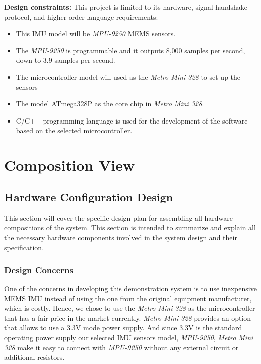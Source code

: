 		\textbf{Design constraints:} This project is limited to its hardware, signal handshake protocol, and higher order language requirements:\\
		\begin{itemize}
			\item This IMU model will be \textit{MPU-9250} MEMS sensors. 
			\item The \textit{MPU-9250} is programmable and it outputs 8,000 samples per second, down to 3.9 samples per second.
			\item The microcontroller model will used as the \textit{Metro Mini 328} to set up the sensors
			\item The model ATmega328P as the core chip in \textit{Metro Mini 328}.
			\item C/C++ programming language is used for the development of the software based on the selected microcontroller.
		\end{itemize}

\section{Composition View}
	\subsection{Hardware Configuration Design}
	This section will cover the specific design plan for assembling all hardware compositions of the system. This section is intended to summarize and explain all the necessary hardware components involved in the system design and their specification.

		\subsubsection{Design Concerns}
		One of the concerns in developing this demonstration system is to use inexpensive MEMS IMU instead of using the one from the original equipment manufacturer, which is costly. Hence, we chose to use the \textit{Metro Mini 328} as the microcontroller that has a fair price in the market currently. \textit{Metro Mini 328} provides an option that allows to use a 3.3V mode power supply. And since 3.3V is the standard operating power supply our selected IMU sensors model, \textit{MPU-9250}, \textit{Metro Mini 328} make it easy to connect with \textit{MPU-9250} without any external circuit or additional resistors.

